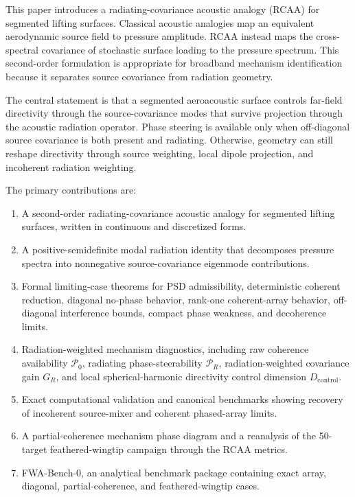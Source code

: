 \documentclass[11pt]{article}
\begin{document}
This paper introduces a radiating-covariance acoustic analogy (RCAA) for segmented lifting surfaces. Classical acoustic analogies map an equivalent aerodynamic source field to pressure amplitude. RCAA instead maps the cross-spectral covariance of stochastic surface loading to the pressure spectrum. This second-order formulation is appropriate for broadband mechanism identification because it separates source covariance from radiation geometry.

The central statement is that a segmented aeroacoustic surface controls far-field directivity through the source-covariance modes that survive projection through the acoustic radiation operator. Phase steering is available only when off-diagonal source covariance is both present and radiating. Otherwise, geometry can still reshape directivity through source weighting, local dipole projection, and incoherent radiation weighting.

The primary contributions are:
\begin{enumerate}
    \item A second-order radiating-covariance acoustic analogy for segmented lifting surfaces, written in continuous and discretized forms.
    \item A positive-semidefinite modal radiation identity that decomposes pressure spectra into nonnegative source-covariance eigenmode contributions.
    \item Formal limiting-case theorems for PSD admissibility, deterministic coherent reduction, diagonal no-phase behavior, rank-one coherent-array behavior, off-diagonal interference bounds, compact phase weakness, and decoherence limits.
    \item Radiation-weighted mechanism diagnostics, including raw coherence availability $\mathcal P_0$, radiating phase-steerability $\mathcal P_R$, radiation-weighted covariance gain $G_R$, and local spherical-harmonic directivity control dimension $D_{\mathrm{control}}$.
    \item Exact computational validation and canonical benchmarks showing recovery of incoherent source-mixer and coherent phased-array limits.
    \item A partial-coherence mechanism phase diagram and a reanalysis of the 50-target feathered-wingtip campaign through the RCAA metrics.
    \item FWA-Bench-0, an analytical benchmark package containing exact array, diagonal, partial-coherence, and feathered-wingtip cases.
\end{enumerate}
\end{document}

